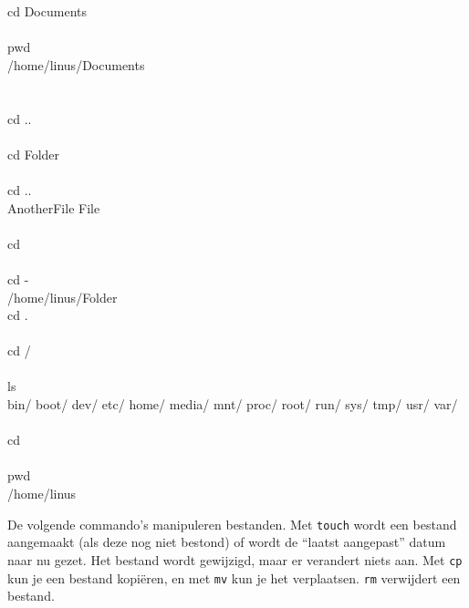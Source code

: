 \begin{bash}
\p cd Documents\\
\  \\
 pwd\\
/home/linus/Documents\\\\
\  \\
 cd ..\\
\  \\
\p cd Folder\\
\  \\
 cd ..\\
AnotherFile  File\\
\  \\
 cd \asciitilde\\
\  \\
\p cd -\\
/home/linus/Folder
\  \\
 cd .\\
\  \\
 cd /\\
\  \\
\p[/] ls\\
bin/  boot/  dev/  etc/  home/  media/  mnt/  proc/  root/  run/  sys/  tmp/  usr/  var/\\
\  \\
\p[/] cd\\
\  \\
\p pwd\\
/home/linus\\
\end{bash}

De volgende commando's manipuleren bestanden. Met \texttt{touch} wordt een bestand aangemaakt (als deze nog niet bestond) of wordt de ``laatst aangepast'' datum naar nu gezet. Het bestand wordt gewijzigd, maar er verandert niets aan. Met \texttt{cp} kun je een bestand kopiëren, en met \texttt{mv} kun je het verplaatsen. \texttt{rm} verwijdert een bestand.

